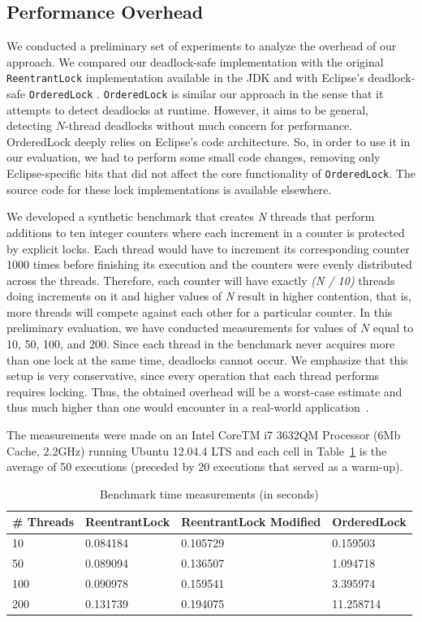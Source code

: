 \subsection{Performance Overhead}\label{sec:perf}

We conducted a preliminary set of experiments to analyze the overhead of our approach. We compared our deadlock-safe implementation with the original {\tt ReentrantLock} implementation available in the JDK and with Eclipse's deadlock-safe {\tt OrderedLock} \cite{orderedlock}. {\tt OrderedLock} is similar our approach in the sense that it attempts to detect deadlocks at runtime. However, it aims to be general, detecting $N$-thread deadlocks without much concern for performance. 
OrderedLock deeply relies on Eclipse's code architecture. So, in order to use it in our evaluation, we had to perform some small code changes, removing only Eclipse-specific bits that did not affect the core functionality of {\tt OrderedLock}. The source code for these lock implementations is available elsewhere\cite{repo}.

We developed a synthetic benchmark that creates \emph{N} threads that perform additions to ten integer counters where each increment in a counter is protected by explicit locks. Each thread would have to increment its corresponding counter 1000 times before finishing its execution and the counters were evenly distributed across the threads. Therefore, each counter will have exactly \emph{(N / 10)} threads doing increments on it and higher values of \emph{N} result in higher contention, that is, more threads will compete against each other for a particular counter. In this preliminary evaluation, we have conducted measurements for values of $N$ equal to 10, 50, 100, and 200. Since each thread in the benchmark never acquires more than one lock at the same time, deadlocks cannot occur. We emphasize that this setup is very conservative, since every operation that each thread performs requires locking. Thus, the obtained overhead will be a worst-case estimate and thus much higher than one would encounter in a real-world application~\cite{lozi}. 

The measurements were made on an Intel CoreTM i7 3632QM Processor (6Mb Cache, 2.2GHz) running Ubuntu 12.04.4 LTS and each cell in Table~\ref{tab:overhead} is the average of 50 executions (preceded by 20 executions that served as a warm-up). 

\begin{table}
\begin{center}
\caption{Benchmark time measurements (in seconds)}\label{tab:overhead}
\begin{tabular}{|l|l|l|l|}
\hline
\# Threads & ReentrantLock & ReentrantLock Modified & OrderedLock \\
\hline
10 & 0.084184 & 0.105729 & 0.159503\\
50 & 0.089094 & 0.136507 & 1.094718\\
100 & 0.090978 & 0.159541 & 3.395974\\
200 & 0.131739 & 0.194075 & 11.258714\\
\hline
\end{tabular}
\end{center}
\end{table}

